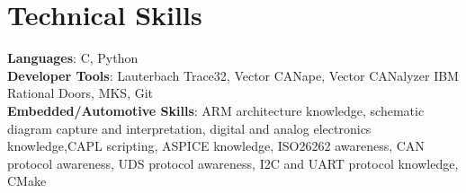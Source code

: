 \documentclass[letterpaper,11pt]{article}
\begin{document}
\section{Technical Skills}
 \begin{itemize}[leftmargin=0.15in, label={}]
    \small{\item{
     \textbf{Languages}{: C, Python} \\
     \textbf{Developer Tools}{: Lauterbach Trace32, Vector CANape, Vector CANalyzer IBM Rational Doors, MKS, Git} \\
     \textbf{Embedded/Automotive Skills}{: ARM architecture knowledge, schematic diagram capture and interpretation, digital and analog electronics knowledge,CAPL scripting, ASPICE knowledge, ISO26262 awareness, CAN protocol awareness, UDS protocol awareness, I2C and UART protocol knowledge, CMake } \\

    }}
 \end{itemize}


\end{document}
